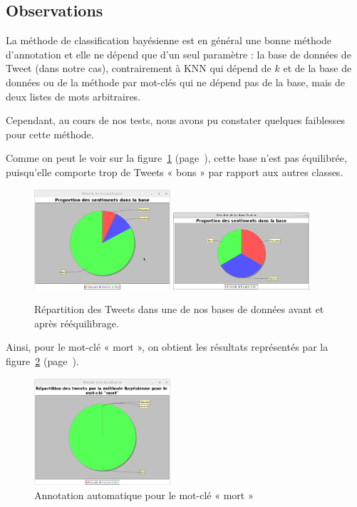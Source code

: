 \documentclass[12pt,a4paper]{report}
\begin{document}
\subsection{Observations}
La méthode de classification bayésienne est en général une bonne méthode
d'annotation et elle ne dépend que d'un seul paramètre : la base de données de
Tweet (dans notre cas), contrairement à KNN qui dépend de $k$ et de la base de
données ou de la méthode par mot-clés qui ne dépend pas de la base, mais de deux
listes de mots arbitraires.

Cependant, au cours de nos tests, nous avons pu constater quelques faiblesses
pour cette méthode.

Comme on peut le voir sur la figure~\ref{capture_repartition_Tweetsv7}
(page~\pageref{capture_repartition_Tweetsv7}), cette
base n'est pas équilibrée, puisqu'elle comporte trop de Tweets « bons » par
rapport aux autres classes.

\begin{figure}
	\centering
	\includegraphics[width=0.45\textwidth]{img/resultats_classification_tweetsv7.eps}
	\includegraphics[width=0.45\textwidth]{img/classificationV8.png}
	\caption{Répartition des Tweets dans une de nos bases de données avant
	et après rééquilibrage.}
\label{capture_repartition_Tweetsv7}
\end{figure}

Ainsi, pour le mot-clé « mort », on obtient les résultats représentés par la
figure~\ref{capture_classification_mort_Tweetsv7}
(page~\pageref{capture_classification_mort_Tweetsv7}).

\begin{figure}
	\centering
	\includegraphics[width=0.45\textwidth]{img/bayes_annotation_mort_tweetsv7.eps}
	\caption{Annotation automatique pour le mot-clé « mort »}
\label{capture_classification_mort_Tweetsv7}
\end{figure}
\end{document}
